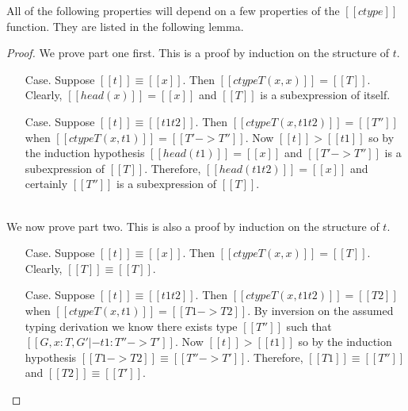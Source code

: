 All of the following properties will depend on a few 
properties of the $[[ctype]]$ function.  They are listed in 
the following lemma.
\begin{proof}
  We prove part one first. This is a proof by induction on the structure of $t$.

  \begin{itemize}
  \item[Case.] Suppose $[[t]] \equiv [[x]]$.  Then $[[ctype T (x,x)]] = [[T]]$.  Clearly,
    $[[head(x)]] = [[x]]$ and $[[T]]$ is a subexpression of itself.
    
  \item[Case.] Suppose $[[t]] \equiv [[t1 t2]]$.  Then $[[ctype T (x,t1 t2)]] = [[T'']]$
    when $[[ctype T (x,t1)]] = [[T' -> T'']]$.  Now $[[t]] > [[t1]]$ so by the induction
    hypothesis $[[head(t1)]] = [[x]]$ and $[[T' -> T'']]$ is a subexpression of $[[T]]$.
    Therefore, $[[head(t1 t2)]] = [[x]]$ and certainly $[[T'']]$ is a subexpression of $[[T]]$.
  \end{itemize}

  \ \\
  We now prove part two.  This is also a proof by induction on the structure of $t$.

  \begin{itemize}
  \item[Case.] Suppose $[[t]] \equiv [[x]]$.  Then $[[ctype T (x,x)]] = [[T]]$.  Clearly,
    $[[T]] \equiv [[T]]$.
    
  \item[Case.] Suppose $[[t]] \equiv [[t1 t2]]$.  Then $[[ctype T (x,t1 t2)]] = [[T2]]$
    when $[[ctype T (x,t1)]] = [[T1 -> T2]]$.  By inversion on the assumed typing
    derivation we know there exists type $[[T'']]$ such that $[[G,x:T,G' |- t1:T'' -> T']]$.
    Now $[[t]] > [[t1]]$ so by the induction hypothesis $[[T1 -> T2]] \equiv [[T'' -> T']]$.
    Therefore, $[[T1]] \equiv [[T'']]$ and $[[T2]] \equiv [[T']]$.
  \end{itemize}
\end{proof}

